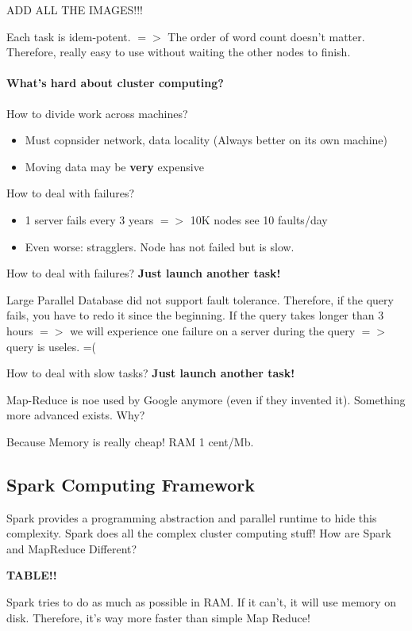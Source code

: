 ADD ALL THE IMAGES!!! 

Each task is idem-potent. $=>$ The order of word count doesn't matter. Therefore, really easy to use without waiting the other nodes to finish.

\paragraph{What's hard about cluster computing?}

How to divide work across machines?
\begin{itemize}
 \item Must copnsider network, data locality (Always better on its own machine)
 \item Moving data may be {\bf very} expensive
\end{itemize}

How to deal with failures?
\begin{itemize}
 \item 1 server fails every 3 years $=>$ 10K nodes see 10 faults/day
 \item Even worse: stragglers. Node has not failed but is slow.
\end{itemize}

How to deal with failures? {\bf Just launch another task!}

Large Parallel Database did not support fault tolerance. Therefore, if the query fails, you have to redo it since the beginning. If the query takes longer than 3 hours $=>$ we will experience one failure on a server during the query $=>$ query is useles. =(

How to deal with slow tasks? {\bf Just launch another task!}

Map-Reduce is noe used by Google anymore (even if they invented it). Something more advanced exists. Why? 

Because Memory is really cheap! RAM 1 cent/Mb. 

\subsection{Spark Computing Framework}

Spark provides a programming abstraction and parallel runtime to hide this complexity. Spark does all the complex cluster computing stuff! How are Spark and MapReduce Different?

{\bf TABLE!!}

Spark tries to do as much as possible in RAM. If it can't, it will use memory on disk. Therefore, it's way more faster than simple Map Reduce! 

